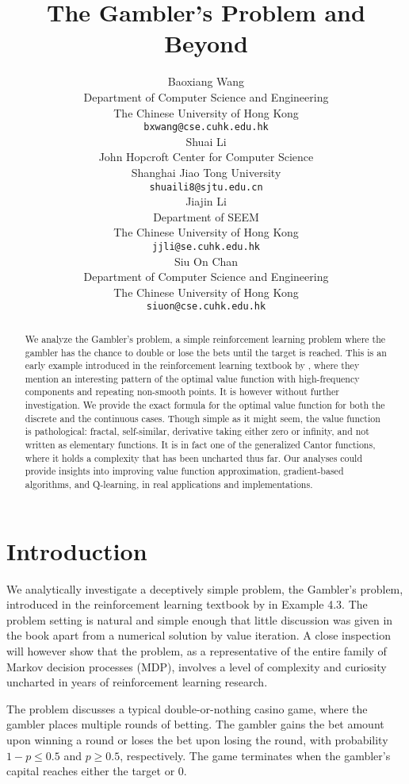 \documentclass{article}
\title{The Gambler's Problem and Beyond}
\author{Baoxiang Wang \\
Department of Computer Science and Engineering\\
The Chinese University of Hong Kong\\
\texttt{bxwang@cse.cuhk.edu.hk} \\
\And
Shuai Li \\
John Hopcroft Center for Computer Science \\
Shanghai Jiao Tong University \\
\texttt{shuaili8@sjtu.edu.cn} \\
\AND
Jiajin Li \\
Department of SEEM \\
The Chinese University of Hong Kong \\
\texttt{jjli@se.cuhk.edu.hk} \\
\AND
Siu On Chan \\
Department of Computer Science and Engineering\\
The Chinese University of Hong Kong\\
\texttt{siuon@cse.cuhk.edu.hk}
}
\theoremstyle{named}
\begin{document}
\maketitle

\begin{abstract}
We analyze the Gambler's problem, a simple reinforcement learning problem where the gambler has the chance to double or lose the bets until the target is reached. This is an early example introduced in the reinforcement learning textbook by \cite{sutton2018reinforcement}, where they mention an interesting pattern of the optimal value function with high-frequency components and repeating non-smooth points. It is however without further investigation. We provide the exact formula for the optimal value function for both the discrete and the continuous cases. Though simple as it might seem, the value function is pathological: fractal, self-similar, derivative taking either zero or infinity, and not written as elementary functions. It is in fact one of the generalized Cantor functions, where it holds a complexity that has been uncharted thus far. Our analyses could provide insights into improving value function approximation, gradient-based algorithms, and Q-learning, in real applications and implementations.
\end{abstract}

\section{Introduction}

We analytically investigate a deceptively simple problem, the Gambler's problem, introduced in the reinforcement learning textbook by \cite{sutton2018reinforcement} in Example 4.3. 
The problem setting is natural and simple enough that little discussion was given in the book apart from a numerical solution by value iteration.
A close inspection will however show that the problem, as a representative of the entire family of Markov decision processes (MDP), involves a level of complexity and curiosity uncharted in years of reinforcement learning research.

The problem discusses a typical double-or-nothing casino game, where the gambler places multiple rounds of betting. 
The gambler gains the bet amount upon winning a round or loses the bet upon losing the round, with probability $1- p\leq 0.5$ and  $p\geq 0.5$, respectively.
The game terminates when the gambler's capital reaches either the target or $0$.
\end{document}
